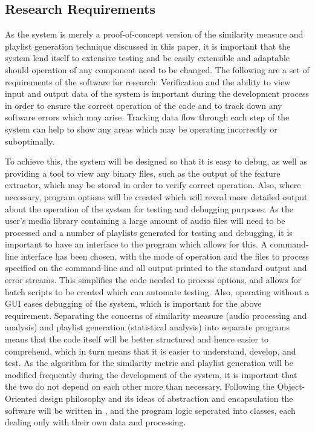 \subsection{Research Requirements}
As the system is merely a proof-of-concept version of the similarity measure and playlist generation technique discussed in this paper, it is important that the system lend itself to extensive testing and be easily extensible and adaptable should operation of any component need to be changed. The following are a set of requirements of the software for research: 
Verification and the ability to view input and output data of the system is important during the development process in order to ensure the correct operation of the code and to track down any software errors which may arise. Tracking data flow through each step of the system can help to show any areas which may be operating incorrectly or suboptimally.

To achieve this, the system will be designed so that it is easy to debug, as well as providing a tool to view any binary files, such as the output of the feature extractor, which may be stored in order to verify correct operation. Also, where necessary, program options will be created which will reveal more detailed output about the operation of the system for testing and debugging purposes.
\label{text:spec:objective:cli}
As the user's media library containing a large amount of audio files will need to be processed and a number of playlists generated for testing and debugging, it is important to have an interface to the program which allows for this. A command-line interface has been chosen, with the mode of operation and the files to process specified on the command-line and all output printed to the standard output and error streams. This simplifies the code needed to process options, and allows for batch scripts to be created which can automate testing. Also, operating without a GUI eases debugging of the system, which is important for the above requirement.
Separating the concerns of similarity measure (audio processing and analysis) and playlist generation (statistical analysis) into separate programs means that the code itself will be better structured and hence easier to comprehend, which in turn means that it is easier to understand, develop, and test. As the algorithm for the similarity metric and playlist generation will be modified frequently during the development of the system, it is important that the two do not depend on each other more than necessary. Following the Object-Oriented design philosophy and its ideas of abstraction and encapsulation the software will be written in , and the program logic seperated into classes, each dealing only with their own data and processing.
